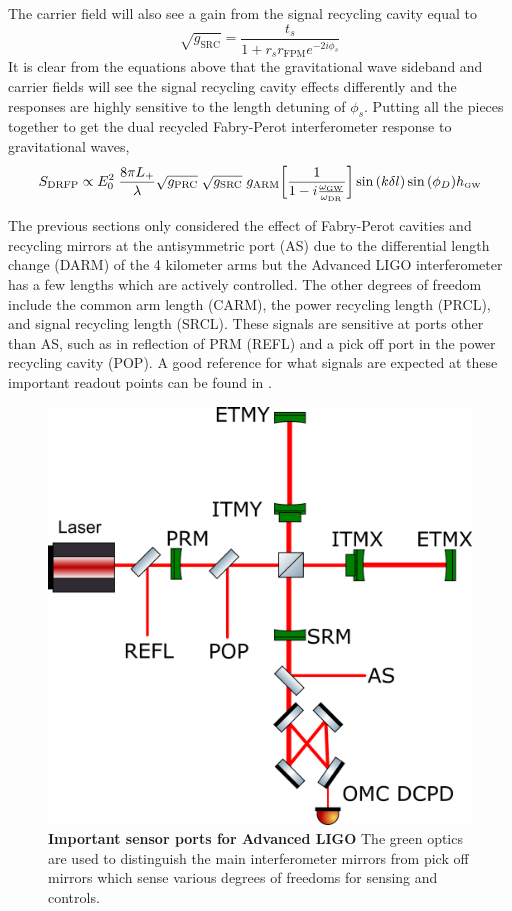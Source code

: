 		The carrier field will also see a gain from the signal recycling cavity equal to
		\begin{equation}
		\sqrt{g_{\text{SRC}}} = \frac{t_s}{1+ r_s r_{\text{FPM}}   e^{-2i\phi_s}}
		\end{equation}
		It is clear from the equations above that the gravitational wave sideband and carrier fields will see the signal recycling cavity effects differently and the responses are highly sensitive to the length detuning of $\phi_s$.
		Putting all the pieces together to get the dual recycled Fabry-Perot interferometer response to gravitational waves,
		\begin{equation}\label{eq:DRFP_opt_gain}
		S_{\text{DRFP}} \propto E_0^2 \; \frac{8\pi L_+}{\lambda} \sqrt{g_{\text{PRC}}}\;\sqrt{g_{\text{SRC}}}\; g_{\text{ARM}} \bigg[\frac{1}{1 - i \frac{\omega_{\text{\tiny GW}}}{\omega_{\text{DR}}}}\bigg] \sin{(k\delta l)} \sin{(\phi_{D})} h_{\text{\tiny GW}}
		\end{equation}

		The previous sections only considered the effect of Fabry-Perot cavities and recycling mirrors at the antisymmetric port (AS) due to the differential length change (DARM) of the 4 kilometer arms but the Advanced LIGO interferometer has a few lengths which are actively controlled. The other degrees of freedom include the common arm length (CARM), the power recycling length (PRCL), and signal recycling length (SRCL).  These signals are sensitive at ports other than AS, such as in reflection of PRM (REFL) and a pick off port in the power recycling cavity (POP).  A good reference for what signals are expected at these important readout points can be found in \cite{kiwamu_freq1} \cite{kiwamu_freq2} \cite{kiwamu_freq3}.
		
		\begin{figure}[ht]
			\centering
			\includegraphics[width=0.7 \textwidth]{../Figures/FullIFO.png}
			\caption[Important sensor ports for Advanced LIGO]
			{\textbf{Important sensor ports for Advanced LIGO}  The green optics are used to distinguish the main interferometer mirrors from pick off mirrors which sense various degrees of freedoms for sensing and controls.
			}
			\label{fig:FullIFO}
		\end{figure}
		
